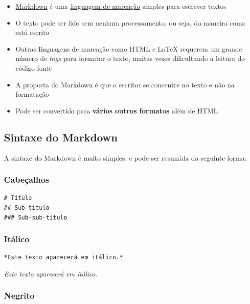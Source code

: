 \documentclass[
  10pt,
  a4paper]{book}
\providecommand{\tightlist}{%
  \setlength{\itemsep}{0pt}\setlength{\parskip}{0pt}}
\begin{document}
\begin{itemize}
\tightlist
\item
  \href{http://daringfireball.net/projects/markdown}{Markdown} é uma \href{https://pt.wikipedia.org/wiki/Linguagem_de_marcação/}{linguagem de marcação} simples para escrever
  textos
\item
  O texto pode ser lido sem nenhum processamento, ou seja, da maneira
  como está escrito
\item
  Outras linguagens de marcação como HTML e LaTeX requerem um grande
  número de \emph{tags} para formatar o texto, muitas vezes dificultando a
  leitura do código-fonte
\item
  A proposta do Markdown é que o escritor se concentre no texto e não na
  formatação
\item
  Pode ser convertido para \textbf{vários outros formatos} além de HTML
\end{itemize}

\hypertarget{sintaxe-do-markdown}{%
\subsection{Sintaxe do Markdown}\label{sintaxe-do-markdown}}

A sintaxe do Markdown é muito simples, e pode ser resumida da seguinte
forma:

\hypertarget{cabeuxe7alhos}{%
\subsubsection*{Cabeçalhos}\label{cabeuxe7alhos}}


\begin{verbatim}
# Título
## Sub-título
### Sub-sub-título
\end{verbatim}

\hypertarget{ituxe1lico}{%
\subsubsection*{Itálico}\label{ituxe1lico}}


\begin{verbatim}
*Este texto aparecerá em itálico.*
\end{verbatim}

\emph{Este texto aparecerá em itálico.}

\hypertarget{negrito}{%
\subsubsection*{Negrito}\label{negrito}}
\end{document}
